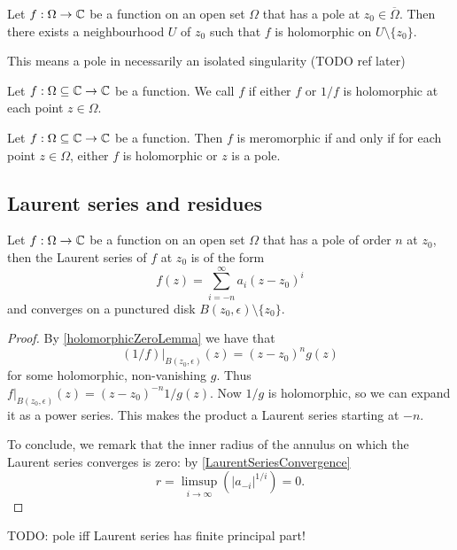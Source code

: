 \begin{lemma}
Let $f:\Omega\to \mathbb{C}$ be a function on an open set $\Omega$ that has a pole at $z_0\in \overline{\Omega}$. Then there exists a neighbourhood $U$ of $z_0$ such that $f$ is holomorphic on $U\setminus\{z_0\}$.
\end{lemma}
This means a pole in necessarily an isolated singularity (TODO ref later)

\begin{definition}
Let $f: \Omega\subseteq \mathbb{C} \to \mathbb{C}$ be a function. We call $f$  if either $f$ or $1/f$ is holomorphic at each point $z\in \Omega$.
\end{definition}

\begin{lemma}
Let $f: \Omega\subseteq \mathbb{C} \to \mathbb{C}$ be a function. Then $f$ is meromorphic \textup{if and only if} for each point $z\in \Omega$, either $f$ is holomorphic or $z$ is a pole.
\end{lemma}

\subsection{Laurent series and residues}
\begin{proposition}
Let $f:\Omega\to \mathbb{C}$ be a function on an open set $\Omega$ that has a pole of order $n$ at $z_0$, then the Laurent series of $f$ at $z_0$ is of the form
\[  f(z) = \sum_{i=-n}^\infty a_i(z-z_0)^i \]
and converges on a punctured disk $B(z_0, \epsilon)\setminus\{z_0\}$.
\end{proposition}
\begin{proof}
By \ref{holomorphicZeroLemma} we have that 
\[ (1/f)|_{B(z_0,\epsilon)}(z) = (z-z_0)^ng(z) \]
for some holomorphic, non-vanishing $g$. Thus $f|_{B(z_0,\epsilon)}(z) = (z-z_0)^{-n}1/g(z)$. Now $1/g$ is holomorphic, so we can expand it as a power series. This makes the product a Laurent series starting at $-n$.

To conclude, we remark that the inner radius of the annulus on which the Laurent series converges is zero: by \ref{LaurentSeriesConvergence}
\[ r = \limsup_{i\to\infty}\left(|a_{-i}|^{1/i}\right) = 0. \]
\end{proof}
TODO: pole iff Laurent series has finite principal part!

